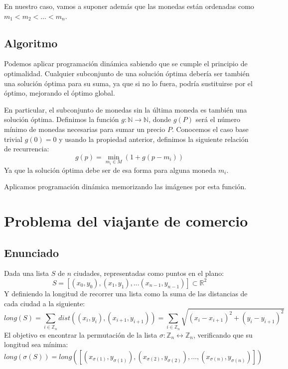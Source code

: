 \documentclass[a4paper, 11pt]{article} %
\begin{document}
    En nuestro caso, vamos a suponer además que las monedas están ordenadas como
    $m_1 < m_2 < \dots < m_n$. 
    
  \subsection{Algoritmo}
    Podemos aplicar programación dinámica sabiendo que se cumple el principio de optimalidad.
    Cualquier subconjunto de una solución óptima debería ser también una solución óptima para
    su suma, ya que si no lo fuera, podría sustituirse por el óptimo, mejorando el óptimo global.
    
    En particular, el subconjunto de monedas sin la última moneda es también una solución óptima.
    Definimos la función $g: \mathbb{N} \to \mathbb{N}$, donde $g(P)$ será el número
    mínimo de monedas necesarias para sumar un precio $P$. Conocemos el caso base trivial $g(0) = 0$ y
    usando la propiedad anterior, definimos la siguiente relación de recurrencia:
    \begin{equation}
      g(p) = \min_{m_i \in M} (1 + g(p - m_i))
    \end{equation}
    Ya que la solución óptima debe ser de esa forma para alguna moneda $m_i$.
  
    Aplicamos programación dinámica memorizando las imágenes por esta función.
  
\section{Problema del viajante de comercio}
  \subsection{Enunciado}
  	Dada una lista $S$ de $n$ ciudades, representadas como puntos en el plano:
  	\begin{equation}
  	    S = [(x_0,y_0), (x_1,y_1), \dots (x_{n-1},y_{n-1})] \subset \mathbb{R}^2
  	\end{equation}
  	Y definiendo la longitud de recorrer una lista como la suma de las distancias de cada ciudad a la siguiente:
  	\begin{equation}
  	    long(S) = \sum_{i \in \mathbb{Z}_n} dist((x_i,y_i), (x_{i+1}, y_{i+1})) = \sum_{i \in \mathbb{Z}_n} \sqrt{(x_i-x_{i+1})^2 + (y_i-y_{i+1})^2}
  	\end{equation}
  	El objetivo es encontrar la permutación de la lista $\sigma : \mathbb{Z}_n \leftrightarrow \mathbb{Z}_n$, verificando que su longitud sea mínima:
  	\begin{equation}
  	    long(\sigma(S)) = long([(x_{\sigma(1)},y_{\sigma(1)}), (x_{\sigma(2)},y_{\sigma(2)}), \dots, (x_{\sigma(n)},y_{\sigma(n)})])
      \end{equation}
      
\end{document}
